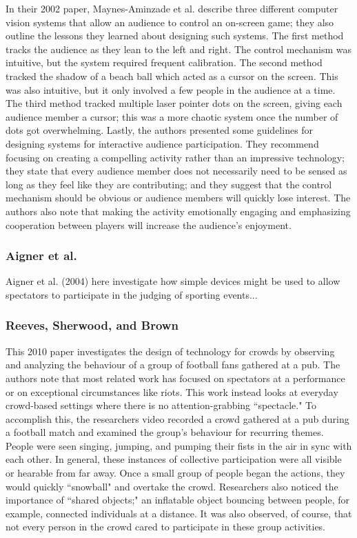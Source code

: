 In their 2002 paper, Maynes-Aminzade et al. describe three different computer vision systems that allow an audience to control an on-screen game; they also outline the lessons they learned about designing such systems. The first method tracks the audience as they lean to the left and right. The control mechanism was intuitive, but the system required frequent calibration. The second method tracked the shadow of a beach ball which acted as a cursor on the screen. This was also intuitive, but it only involved a few people in the audience at a time. The third method tracked multiple laser pointer dots on the screen, giving each audience member a cursor; this was a more chaotic system once the number of dots got overwhelming. Lastly, the authors presented some guidelines for designing systems for interactive audience participation. They recommend focusing on creating a compelling activity rather than an impressive technology; they state that every audience member does not necessarily need to be sensed as long as they feel like they are contributing; and they suggest that the control mechanism should be obvious or audience members will quickly lose interest. The authors also note that making the activity emotionally engaging and emphasizing cooperation between players will increase the audience's enjoyment.

\subsubsection{Aigner et al.}

Aigner et al. (2004) here investigate how simple devices might be used to allow spectators to participate in the judging of sporting events...

\subsubsection{Reeves, Sherwood, and Brown}

This 2010 paper investigates the design of technology for crowds by observing and analyzing the behaviour of a group of football fans gathered at a pub. The authors note that most related work has focused on spectators at a performance or on exceptional circumstances like riots. This work instead looks at everyday crowd-based settings where there is no attention-grabbing ``spectacle." To accomplish this, the researchers video recorded a crowd gathered at a pub during a football match and examined the group's behaviour for recurring themes. People were seen singing, jumping, and pumping their fists in the air in sync with each other. In general, these instances of collective participation were all visible or hearable from far away. Once a small group of people began the actions, they would quickly ``snowball" and overtake the crowd. Researchers also noticed the importance of ``shared objects;" an inflatable object bouncing between people, for example, connected individuals at a distance. It was also observed, of course, that not every person in the crowd cared to participate in these group activities.

